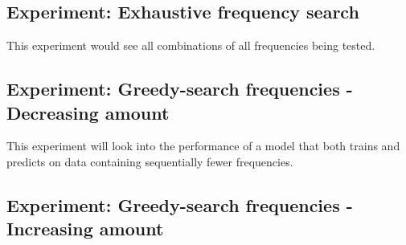     \subsection{Experiment: Exhaustive frequency search}
        This experiment would see all combinations of all frequencies being tested. 


    \subsection{Experiment: Greedy-search frequencies - Decreasing amount}
        This experiment will look into the performance of a model that both trains and predicts on data containing sequentially fewer frequencies. 
        
        
    \subsection{Experiment: Greedy-search frequencies - Increasing amount}
    
        

